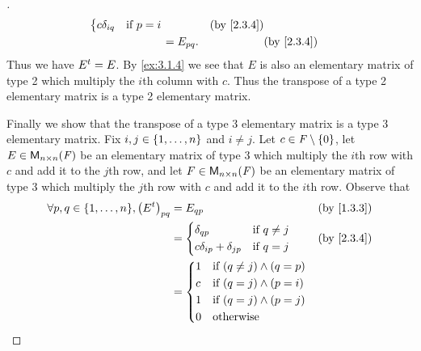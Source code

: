 \begin{proof}[]
\begin{align*}
\begin{dcases}
			                                                          c \delta_{i q} & \text{if } p = i
		                                                          \end{dcases}    &  & \by{2.3.4}                     \\
		                                                      & = E_{p q}.                                 &  & \by{2.3.4}
	\end{align*}
	Thus we have \({E}^{t} = E\).
	By \cref{ex:3.1.4} we see that \(E\) is also an elementary matrix of type 2 which multiply the \(i\)th column with \(c\).
	Thus the transpose of a type 2 elementary matrix is a type 2 elementary matrix.

	Finally we show that the transpose of a type 3 elementary matrix is a type 3 elementary matrix.
	Fix \(i, j \in \left\lbrace1, \dots, n\right\rbrace\) and \(i \neq j\).
	Let \(c \in \mathit{F} \setminus \left\lbrace0\right\rbrace\), let \(E \in \ms[n][n][\F]\) be an elementary matrix of type 3 which multiply the \(i\)th row with \(c\) and add it to the \(j\)th row, and let \(F \in \ms[n][n][\F]\) be an elementary matrix of type 3 which multiply the \(j\)th row with \(c\) and add it to the \(i\)th row.
	Observe that
	\begin{align*}
		\forall p, q \in \set{1, \dots, n}, \pa{\tp{E}}_{p q} & = E_{q p}                                              &  & \by{1.3.3} \\
		                                                      & = \begin{dcases}
			                                                          \delta_{q p}                  & \text{if } q \neq j \\
			                                                          c \delta_{i p} + \delta_{j p} & \text{if } q = j
		                                                          \end{dcases} &  & \by{2.3.4}                  \\
		                                                      & = \begin{dcases}
			                                                          1 & \text{if } (q \neq j) \land (q = p) \\
			                                                          c & \text{if } (q = j) \land (p = i)    \\
			                                                          1 & \text{if } (q = j) \land (p = j)    \\
			                                                          0 & \text{otherwise}

\end{dcases}
\end{align*}
\end{proof}

